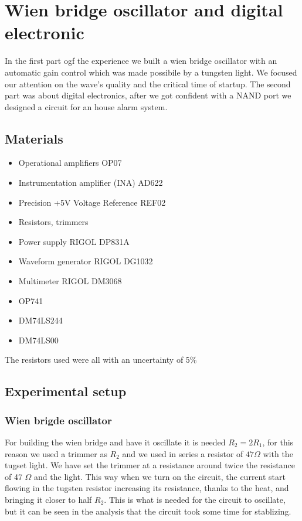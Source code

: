 \chapter{Wien bridge oscillator and digital electronic}
In the first part ogf the experience we built a wien bridge oscillator with an automatic gain control which was made possibile by a tungsten light. We focused our attention on the wave's quality and the critical time of startup. The second part was about digital electronics, after we got confident with a NAND port we designed a circuit for an house alarm system.
\section{Materials}
\begin{itemize}
\item Operational amplifiers OP07
\item Instrumentation amplifier (INA) AD622
\item Precision +5V Voltage Reference REF02
\item Resistors, trimmers
\item Power supply RIGOL DP831A
\item Waveform generator RIGOL DG1032
\item Multimeter RIGOL DM3068
\item OP741
\item DM74LS244
\item DM74LS00
\end{itemize}
The resistors used were all with an uncertainty of 5\%

\section{Experimental setup}
\subsection{Wien brigde oscillator}
For building the wien bridge and have it oscillate it is needed $R_2 = 2 R_1$, for this reason we used a trimmer as $R_2$ and we used in series a resistor of $47 \Omega$ with the tugset light. We have  set the trimmer at a resistance around twice the resistance of 47 $\Omega$ and the light. This way when we turn on the circuit, the current start flowing in the tugsten resistor increasing its resistance, thanks to the heat, and bringing it closer to half $R_2$. This is what is needed for the circuit to oscillate, but it can be seen in the analysis that the circuit took some time for stablizing.
